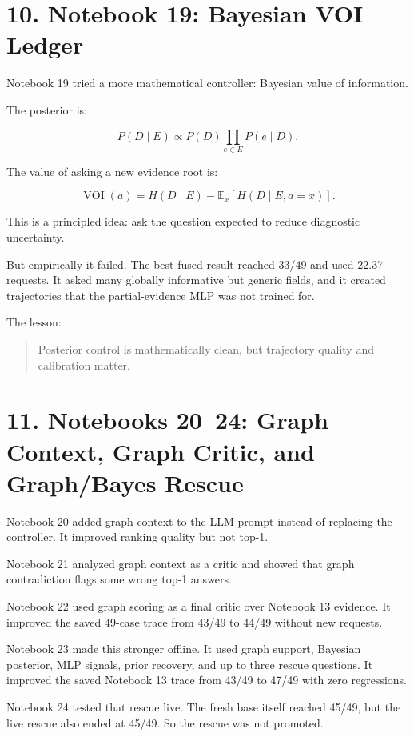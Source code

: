 \documentclass[11pt]{article}
\begin{document}
\section*{10. Notebook 19: Bayesian VOI Ledger}

Notebook 19 tried a more mathematical controller: Bayesian value of information.

The posterior is:

\[
P(D\mid E)\propto P(D)\prod_{e\in E}P(e\mid D).
\]

The value of asking a new evidence root is:

\[
\operatorname{VOI}(a)=H(D\mid E)-\mathbb{E}_{x}[H(D\mid E,a=x)].
\]

This is a principled idea: ask the question expected to reduce diagnostic uncertainty.

But empirically it failed. The best fused result reached 33/49 and used 22.37 requests. It asked many globally informative but generic fields, and it created trajectories that the partial-evidence MLP was not trained for.

The lesson:

\begin{quote}
Posterior control is mathematically clean, but trajectory quality and calibration matter.
\end{quote}

\section*{11. Notebooks 20--24: Graph Context, Graph Critic, and Graph/Bayes Rescue}

Notebook 20 added graph context to the LLM prompt instead of replacing the controller. It improved ranking quality but not top-1.

Notebook 21 analyzed graph context as a critic and showed that graph contradiction flags some wrong top-1 answers.

Notebook 22 used graph scoring as a final critic over Notebook 13 evidence. It improved the saved 49-case trace from 43/49 to 44/49 without new requests.

Notebook 23 made this stronger offline. It used graph support, Bayesian posterior, MLP signals, prior recovery, and up to three rescue questions. It improved the saved Notebook 13 trace from 43/49 to 47/49 with zero regressions.

Notebook 24 tested that rescue live. The fresh base itself reached 45/49, but the live rescue also ended at 45/49. So the rescue was not promoted.
\end{document}
